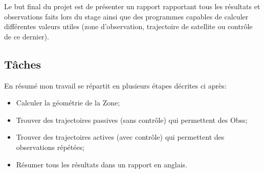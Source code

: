 \documentclass[11pt]{article} %
\begin{document}
		
		Le but final du projet est de présenter un rapport rapportant tous les résultats et observations faits lors du stage ainsi que des programmes capables de calculer différentes valeurs utiles (zone d'observation, trajectoire de satellite ou contrôle de ce dernier).
		\subsection{Tâches}
		En résumé mon travail se répartit en plusieurs étapes décrites ci après:
		\begin{itemize}
			\item Calculer la géométrie de la \gls{Zone};
			\item Trouver des trajectoires passives (sans contrôle) qui permettent des \glspl{Obs};
			\item Trouver des trajectoires actives (avec contrôle) qui permettent des observations répétées;
			\item Résumer tous les résultats dans un rapport en anglais.
		\end{itemize}
		
\end{document}
